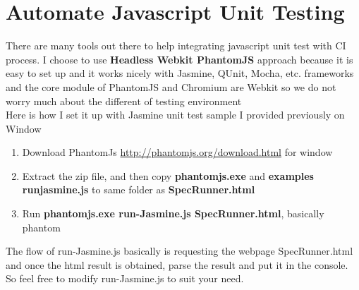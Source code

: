 \documentclass[a4paper,11pt]{article}
\begin{document}
\section{Automate Javascript Unit Testing}
There are many tools out there to help integrating javascript unit test with CI process. I choose to use \textbf{Headless Webkit PhantomJS} approach because it is easy to set up and it works nicely with Jasmine, QUnit, Mocha, etc. frameworks and the core module of PhantomJS and Chromium are Webkit so we do not worry much about the different of testing environment\\
Here is how I set it up with Jasmine unit test sample I provided previously on Window 
\begin{enumerate}
\item Download PhantomJs \url{http://phantomjs.org/download.html} for window
\item Extract the zip file, and then copy \textbf{phantomjs.exe} and \textbf{examples\\runjasmine.js} to same folder as \textbf{SpecRunner.html}
\item Run \textbf{phantomjs.exe run-Jasmine.js SpecRunner.html}, basically phantom
\end{enumerate}
The flow of run-Jasmine.js basically is requesting the webpage SpecRunner.html and once the html result is obtained, parse the result and put it in the console. So feel free to modify run-Jasmine.js to suit your need.
\end{document}
